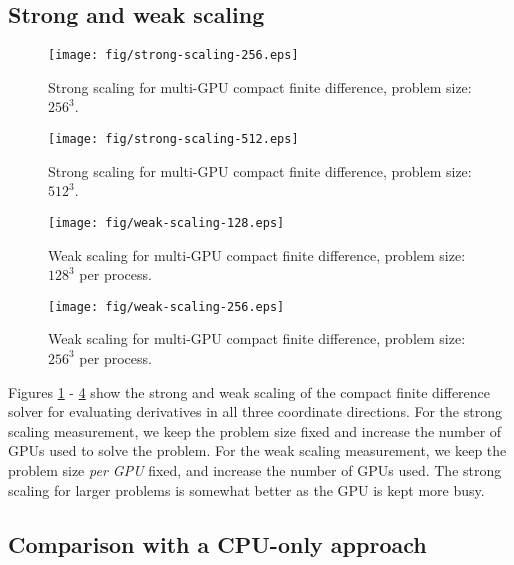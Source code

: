 \subsection{Strong and weak scaling}
\begin{figure}
\begin{center}
\texttt{[image: fig/strong-scaling-256.eps]}
\caption{Strong scaling for multi-GPU compact finite difference, problem size: $256^3$.}
\label{fig:strong-scaling-256}
\end{center}
\end{figure}
%
\begin{figure}
\begin{center}
\texttt{[image: fig/strong-scaling-512.eps]}
\caption{Strong scaling for multi-GPU compact finite difference, problem size: $512^3$.}
\label{fig:strong-scaling-512}
\end{center}
\end{figure}
%
\begin{figure}
\begin{center}
\texttt{[image: fig/weak-scaling-128.eps]}
\caption{Weak scaling for multi-GPU compact finite difference, problem size: $128^3$ per process.}
\label{fig:weak-scaling-128}
\end{center}
\end{figure}
%
\begin{figure}
\begin{center}
\texttt{[image: fig/weak-scaling-256.eps]}
\caption{Weak scaling for multi-GPU compact finite difference, problem size: $256^3$ per process.}
\label{fig:weak-scaling-256}
\end{center}
\end{figure}
%
Figures \ref{fig:strong-scaling-256} - \ref{fig:weak-scaling-256}
show the strong and weak scaling of the compact finite difference solver
for evaluating derivatives in all three coordinate directions.
For the strong scaling measurement,
we keep the problem size fixed
and increase the number of GPUs used to solve the problem.
For the weak scaling measurement,
we keep the problem size \emph{per GPU}
fixed, and increase the number of GPUs used.
The strong scaling for larger problems is somewhat better
as the GPU is kept more busy.

\subsection{Comparison with a CPU-only approach}

